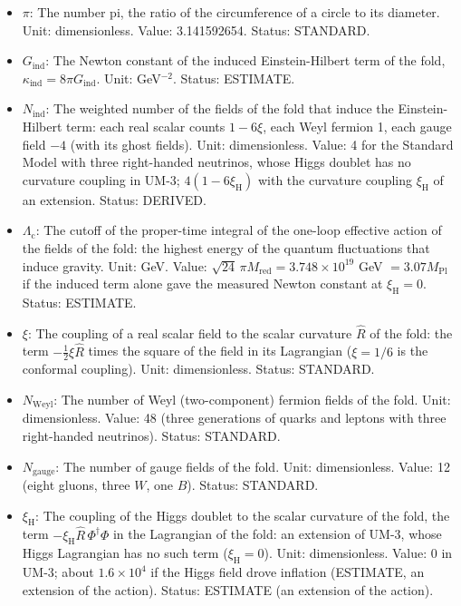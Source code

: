 \documentclass[
  10pt,
]{article}
\providecommand{\tightlist}{%
  \setlength{\itemsep}{0pt}\setlength{\parskip}{0pt}}
\begin{document}
\begin{itemize}
\tightlist
\item
  \(\pi\): The number pi, the ratio of the circumference of a circle to
  its diameter. Unit: dimensionless. Value: 3.141592654. Status:
  STANDARD.
\item
  \(G_{\mathrm{ind}}\): The Newton constant of the induced
  Einstein-Hilbert term of the fold,
  \(\kappa_{\mathrm{ind}} = 8\pi G_{\mathrm{ind}}\). Unit: GeV\(^{-2}\).
  Status: ESTIMATE.
\item
  \(N_{\mathrm{ind}}\): The weighted number of the fields of the fold
  that induce the Einstein-Hilbert term: each real scalar counts
  \(1 - 6\xi\), each Weyl fermion 1, each gauge field \(-4\) (with its
  ghost fields). Unit: dimensionless. Value: 4 for the Standard Model
  with three right-handed neutrinos, whose Higgs doublet has no
  curvature coupling in UM-3; \(4(1 - 6\xi_{\mathrm{H}})\) with the
  curvature coupling \(\xi_{\mathrm{H}}\) of an extension. Status:
  DERIVED.
\item
  \(\Lambda_{\mathrm{c}}\): The cutoff of the proper-time integral of
  the one-loop effective action of the fields of the fold: the highest
  energy of the quantum fluctuations that induce gravity. Unit: GeV.
  Value: \(\sqrt{24}\,\pi M_{\mathrm{red}} = 3.748\times10^{19}\) GeV
  \(= 3.07M_{\mathrm{Pl}}\) if the induced term alone gave the measured
  Newton constant at \(\xi_{\mathrm{H}} = 0\). Status: ESTIMATE.
\item
  \(\xi\): The coupling of a real scalar field to the scalar curvature
  \(\hat R\) of the fold: the term \(-\frac12\xi\hat R\) times the
  square of the field in its Lagrangian (\(\xi = 1/6\) is the conformal
  coupling). Unit: dimensionless. Status: STANDARD.
\item
  \(N_{\mathrm{Weyl}}\): The number of Weyl (two-component) fermion
  fields of the fold. Unit: dimensionless. Value: 48 (three generations
  of quarks and leptons with three right-handed neutrinos). Status:
  STANDARD.
\item
  \(N_{\mathrm{gauge}}\): The number of gauge fields of the fold. Unit:
  dimensionless. Value: 12 (eight gluons, three \(W\), one \(B\)).
  Status: STANDARD.
\item
  \(\xi_{\mathrm{H}}\): The coupling of the Higgs doublet to the scalar
  curvature of the fold, the term
  \(-\xi_{\mathrm{H}}\hat R\,\Phi^\dagger\Phi\) in the Lagrangian of the
  fold: an extension of UM-3, whose Higgs Lagrangian has no such term
  (\(\xi_{\mathrm{H}} = 0\)). Unit: dimensionless. Value: 0 in UM-3;
  about \(1.6\times10^4\) if the Higgs field drove inflation (ESTIMATE,
  an extension of the action). Status: ESTIMATE (an extension of the
  action).
\end{itemize}
\end{document}
